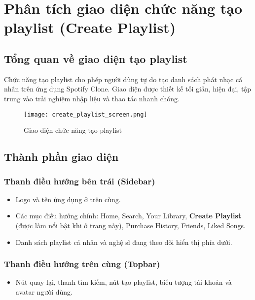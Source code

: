 \documentclass{book}
\let\oldsection\section
\renewcommand{\section}{\clearpage\oldsection}
\begin{document}
\section{Phân tích giao diện chức năng tạo playlist (Create Playlist)}

\subsection{Tổng quan về giao diện tạo playlist}
Chức năng tạo playlist cho phép người dùng tự do tạo danh sách phát nhạc cá nhân trên ứng dụng Spotify Clone. Giao diện được thiết kế tối giản, hiện đại, tập trung vào trải nghiệm nhập liệu và thao tác nhanh chóng.

\begin{figure}[h!]
\centering
\texttt{[image: create\_playlist\_screen.png]} %
\caption{Giao diện chức năng tạo playlist}
\label{fig:createplaylist}
\end{figure}

\subsection{Thành phần giao diện}

\subsubsection{Thanh điều hướng bên trái (Sidebar)}
\begin{itemize}
    \item Logo và tên ứng dụng ở trên cùng.
    \item Các mục điều hướng chính: Home, Search, Your Library, \textbf{Create Playlist} (được làm nổi bật khi ở trang này), Purchase History, Friends, Liked Songs.
    \item Danh sách playlist cá nhân và nghệ sĩ đang theo dõi hiển thị phía dưới.
\end{itemize}

\subsubsection{Thanh điều hướng trên cùng (Topbar)}
\begin{itemize}
    \item Nút quay lại, thanh tìm kiếm, nút tạo playlist, biểu tượng tài khoản và avatar người dùng.
\end{itemize}
\end{document}
